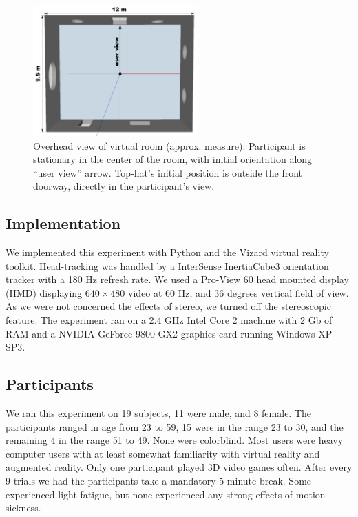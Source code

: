 \documentclass{acmsiggraph}                     %
\begin{document}
\begin{figure}[t]
	\centering
	\includegraphics[width=2.5in]{figures/augmentedroom.png}
	\caption{Overhead view of virtual room (approx. measure).  Participant is stationary in the center of the room, with initial orientation along ``user view'' arrow.  Top-hat's initial position is outside the front doorway, directly in the participant's view.}
\end{figure}

\subsection{Implementation}

We implemented this experiment with Python and the Vizard virtual reality toolkit.  Head-tracking was handled by a InterSense InertiaCube3 orientation tracker with a 180 Hz refresh rate.  We used a Pro-View 60 head mounted display (HMD) displaying $640\times480$ video at 60 Hz, and 36 degrees vertical field of view.  As we were not concerned the effects of stereo, we turned off the stereoscopic feature.  The experiment ran on a 2.4 GHz Intel Core 2 machine with 2 Gb of RAM and a NVIDIA GeForce 9800 GX2 graphics card running Windows XP SP3.

\subsection{Participants}

We ran this experiment on 19 subjects, 11 were male, and 8 female.  The participants ranged in age from 23 to 59, 15 were in the range 23 to 30, and the remaining 4 in the range 51 to 49.  None were colorblind.  Most users were heavy computer users with at least somewhat familiarity with virtual reality and augmented reality.  Only one participant played 3D video games often.  After every 9 trials we had the participants take a mandatory 5 minute break.  Some experienced light fatigue, but none experienced any strong effects of motion sickness.
\end{document}
